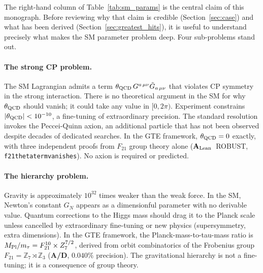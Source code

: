\documentclass[11pt,openany]{book}
\theoremstyle{remark}
\newcommand{\lean}[1]{%
  \penalty-100
  \begingroup\def\_{\textunderscore\allowbreak}\texttt{#1}\endgroup}
\newcommand{\CatAL}{\ensuremath{\textbf{A}_{\rm Lean}}}
\newcommand{\CatAD}{\textbf{A/D}}
\begin{document}
\FloatBarrier

The right-hand column of Table~\ref{tab:sm_params} is the central claim of this
monograph.
Before reviewing why that claim is credible (Section~\ref{sec:case}) and what has been
derived (Section~\ref{sec:greatest_hits}), it is useful to understand precisely what
makes the SM parameter problem deep.
Four sub-problems stand out.

\paragraph{The strong CP problem.}
The SM Lagrangian admits a term
$\theta_{\rm QCD}\,G^{a\,\mu\nu}\tilde{G}_{a\,\mu\nu}$
that violates CP symmetry in the strong interaction.
There is no theoretical argument in the SM for why $\theta_{\rm QCD}$ should vanish;
it could take any value in $[0, 2\pi)$.
Experiment constrains $|\theta_{\rm QCD}| < 10^{-10}$, a fine-tuning of extraordinary
precision.
The standard resolution invokes the Peccei-Quinn axion, an additional particle that
has not been observed despite decades of dedicated searches.
In the GTE framework, $\theta_{\rm QCD} = 0$ exactly, with three independent proofs
from $F_{21}$ group theory alone (\CatAL\ ROBUST, \lean{f21\_theta\_term\_vanishes}).
No axion is required or predicted.

\paragraph{The hierarchy problem.}
Gravity is approximately $10^{32}$ times weaker than the weak force.
In the SM, Newton's constant $G_N$ appears as a dimensionful parameter with no
derivable value.
Quantum corrections to the Higgs mass should drag it to the Planck scale unless
cancelled by extraordinary fine-tuning or new physics (supersymmetry, extra dimensions).
In the GTE framework, the Planck-mass-to-tau-mass ratio is
$M_{\rm Pl}/m_\tau = F_{21}^{10}\times Z_7^{7/2}$, derived from orbit combinatorics
of the Frobenius group $F_{21} = \mathbb{Z}_7 \rtimes \mathbb{Z}_3$ (\CatAD, $0.040\%$
precision).
The gravitational hierarchy is not a fine-tuning; it is a consequence of group theory.
\end{document}
